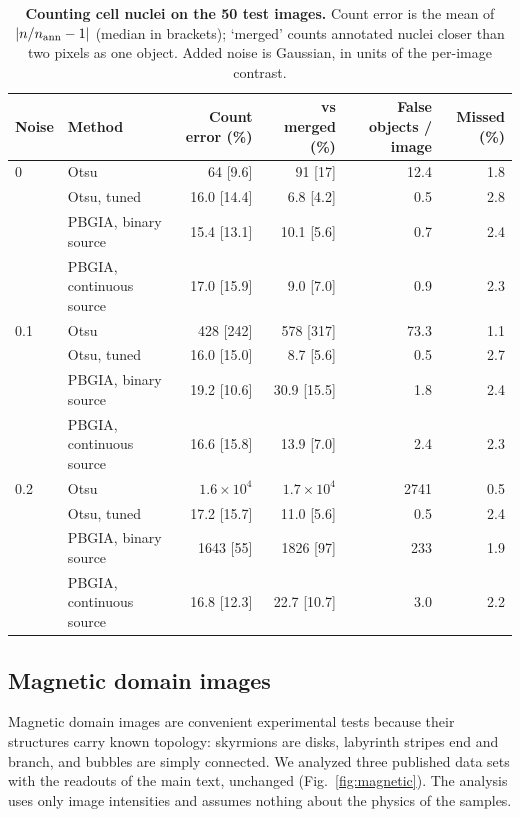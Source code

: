 \documentclass[11pt,a4paper]{article}
\begin{document}
\begin{table}[h]
\centering
\caption{\textbf{Counting cell nuclei on the 50 test images.} Count error is the mean of $|n/n_{\rm ann}-1|$ (median in brackets); `merged' counts annotated nuclei closer than two pixels as one object. Added noise is Gaussian, in units of the per-image contrast.}\label{tab:cells}
\small\begin{tabular}{@{}llrrrr@{}}\toprule
Noise & Method & Count error (\%) & vs merged (\%) & False objects / image & Missed (\%)\\\midrule
0 & Otsu & 64 [9.6] & 91 [17] & 12.4 & 1.8\\
 & Otsu, tuned & 16.0 [14.4] & 6.8 [4.2] & 0.5 & 2.8\\
 & PBGIA, binary source & 15.4 [13.1] & 10.1 [5.6] & 0.7 & 2.4\\
 & PBGIA, continuous source & 17.0 [15.9] & 9.0 [7.0] & 0.9 & 2.3\\\midrule
0.1 & Otsu & 428 [242] & 578 [317] & 73.3 & 1.1\\
 & Otsu, tuned & 16.0 [15.0] & 8.7 [5.6] & 0.5 & 2.7\\
 & PBGIA, binary source & 19.2 [10.6] & 30.9 [15.5] & 1.8 & 2.4\\
 & PBGIA, continuous source & 16.6 [15.8] & 13.9 [7.0] & 2.4 & 2.3\\\midrule
0.2 & Otsu & $1.6\times10^4$ & $1.7\times10^4$ & 2741 & 0.5\\
 & Otsu, tuned & 17.2 [15.7] & 11.0 [5.6] & 0.5 & 2.4\\
 & PBGIA, binary source & 1643 [55] & 1826 [97] & 233 & 1.9\\
 & PBGIA, continuous source & 16.8 [12.3] & 22.7 [10.7] & 3.0 & 2.2\\\bottomrule
\end{tabular}
\end{table}

\subsection{Magnetic domain images}\label{subsec:res:magnetic}
Magnetic domain images are convenient experimental tests because their structures carry known topology: skyrmions are disks, labyrinth stripes end and branch, and bubbles are simply connected. We analyzed three published data sets with the readouts of the main text, unchanged (Fig.~\ref{fig:magnetic}). The analysis uses only image intensities and assumes nothing about the physics of the samples.
\end{document}
